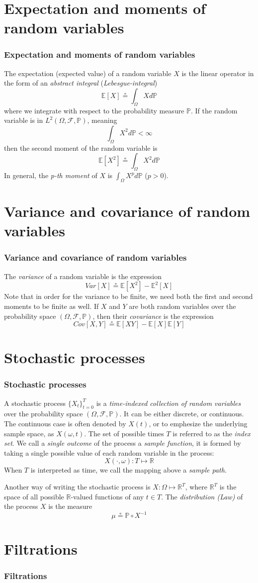 \documentclass[xcolor=dvipsnames]{beamer}
\begin{document}
\section{Expectation and moments of random variables}
\begin{frame}
\frametitle{Expectation and moments of random variables}
The expectation (expected value) of a random variable $X$ is the linear operator in the form of an \emph{abstract integral} (\emph{Lebesgue-integral})
\[
	\mathbb{E}[X] \circeq \int_{\Omega}{Xd\mathbb{P}}
\]
where we integrate with respect to the probability measure $\mathbb{P}$.
If the random variable is in $L^2(\Omega, \mathcal{F}, \mathbb{P})$, meaning
\[
	\int_{\Omega}{X^2d\mathbb{P}} < \infty
\]
then the second moment of the random variable is
\[
	\mathbb{E}[X^2] \circeq \int_{\Omega}{X^2d\mathbb{P}}
\]
In general, the \emph{p-th moment} of $X$ is $\int_{\Omega}{X^pd\mathbb{P}}$ ($p>0$).
\end{frame}
\section{Variance and covariance of random variables}
\begin{frame}
\frametitle{Variance and covariance of random variables}
The \emph{variance} of a random variable is the expression
\[
	Var[X] \circeq \mathbb{E}[X^2] - \mathbb{E}^2[X]
\]
Note that in order for the variance to be finite, we need both the first and second moments to be finite as well. If $X$ and $Y$ are both random variables over the probability space $(\Omega, \mathcal{F}, \mathbb{P})$, then their \emph{covariance} is the expression
\[
	Cov[X,Y] \circeq \mathbb{E}[XY] - \mathbb{E}[X]\mathbb{E}[Y]
\]
\end{frame}
\section{Stochastic processes}
\begin{frame}
\frametitle{Stochastic processes}
A stochastic process $\{X_t\}_{t=0}^{T}$ is a \emph{time-indexed collection of random variables} over the probability space $(\Omega, \mathcal{F}, \mathbb{P})$. It can be either discrete, or continuous. The continuous case is often denoted by $X(t)$, or to emphesize the underlying sample space, as $X(\omega, t)$. The set of possible times $T$ is referred to as the \emph{index set}. We call a \emph{single outcome} of the process a \emph{sample function}, it is formed by taking a single possible value of each random variable in the process:
\[
	X(\cdot, \omega) : T \mapsto \mathbb{R}
\]
When $T$ is interpreted as time, we call the mapping above a \emph{sample path}.
\end{frame}
\begin{frame}
Another way of writing the stochastic process is $X : \Omega \mapsto \mathbb{R}^T$, where $\mathbb{R}^T$ is the space of all possible $\mathbb{R}$-valued functions of any $t \in T$. The \emph{distribution (Law)} of the process $X$ is the measure
\[
	\mu \circeq \mathbb{P} \circ X^{-1}
\]
\end{frame}
\section{Filtrations}
\begin{frame}
\frametitle{Filtrations}
\end{frame}
\end{document}
